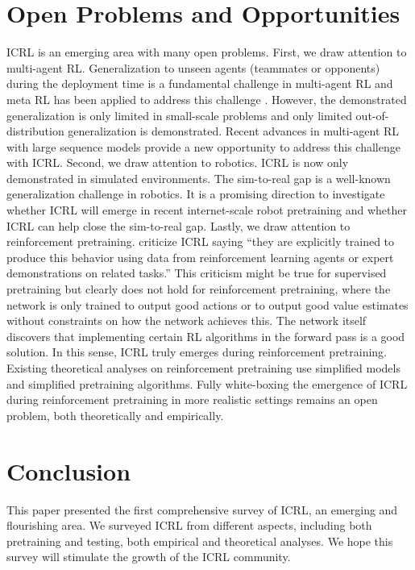 \documentclass{article}
\begin{document}
\section{Open Problems and Opportunities}
\label{sec open problem}
ICRL is an emerging area with many open problems.
First, we draw attention to multi-agent RL.
Generalization to unseen agents (teammates or opponents) during the deployment time is a fundamental challenge in multi-agent RL and meta RL has been applied to address this challenge \citep{charakorn2021learning,gerstgrasser2022meta}.
However,
the demonstrated generalization is only limited in small-scale problems and only limited out-of-distribution generalization is demonstrated.
Recent advances in multi-agent RL with large sequence models \citep{meng2023offline} provide a new opportunity to address this challenge with ICRL.
Second,
we draw attention to robotics.
ICRL is now only demonstrated in simulated environments.
The sim-to-real gap is a well-known generalization challenge in robotics.
It is a promising direction to investigate whether ICRL will emerge in recent internet-scale robot pretraining \citep{rt2}
and whether ICRL can help close the sim-to-real gap.
Lastly, we draw attention to reinforcement pretraining.
\citet{krishnamurthyCanLargeLanguage2024} criticize ICRL saying ``they are explicitly trained to produce this behavior using data from reinforcement learning agents or expert demonstrations on related tasks.''
This criticism might be true for supervised pretraining but clearly does not hold for reinforcement pretraining,
where the network is only trained to output good actions or to output good value estimates without constraints on how the network achieves this.
The network itself discovers that implementing certain RL algorithms in the forward pass is a good solution.
In this sense,
ICRL truly emerges during reinforcement pretraining.
Existing theoretical analyses on reinforcement pretraining \citep{parkLLMAgentsHave2024,wangTransformersLearnTemporal2024} use simplified models and simplified pretraining algorithms.
Fully white-boxing the emergence of ICRL during reinforcement pretraining in more realistic settings
remains an open problem,
both theoretically and empirically.
\section{Conclusion}
This paper presented the first comprehensive survey of ICRL,
an emerging and flourishing area.
We surveyed ICRL from different aspects,
including both pretraining and testing,
both empirical and theoretical analyses.
We hope this survey will stimulate the growth of the ICRL community.
\end{document}
